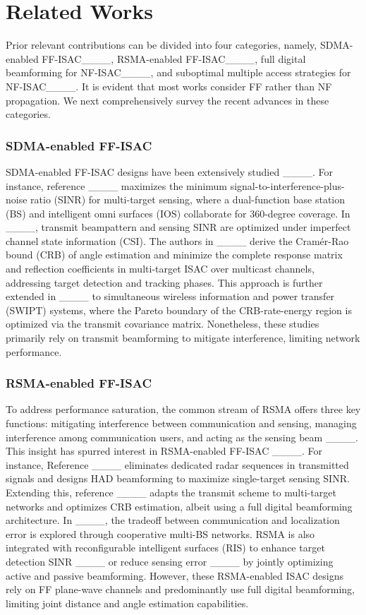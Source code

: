 \section{Related Works}
Prior relevant contributions can be divided into four categories, namely, SDMA-enabled FF-ISAC____, RSMA-enabled FF-ISAC____, full digital beamforming for NF-ISAC____, and suboptimal multiple access strategies for NF-ISAC____. It is evident that most works consider FF rather than NF propagation.  We next comprehensively survey the recent advances in these categories.



\subsubsection{SDMA-enabled FF-ISAC} SDMA-enabled FF-ISAC designs have been extensively studied ____. For instance, reference ____ maximizes the minimum signal-to-interference-plus-noise ratio (SINR) for multi-target sensing, where a dual-function base station (BS) and intelligent omni surfaces (IOS) collaborate for 360-degree coverage. In ____, transmit beampattern and sensing SINR are optimized under imperfect channel state information (CSI). The authors in ____ derive the Cram\'{e}r-Rao bound (CRB) of angle estimation and minimize the complete response matrix and reflection coefficients in multi-target ISAC over multicast channels, addressing target detection and tracking phases. This approach is further extended in ____ to simultaneous wireless information and power transfer (SWIPT) systems, where the Pareto boundary of the CRB-rate-energy region is optimized via the transmit covariance matrix. Nonetheless, these studies primarily rely on transmit beamforming to mitigate interference, limiting network performance.

\subsubsection{RSMA-enabled FF-ISAC} To address performance saturation, the common stream of RSMA offers three key functions: mitigating interference between communication and sensing, managing interference among communication users, and acting as the sensing beam ____. This insight has spurred interest in RSMA-enabled FF-ISAC ____. For instance, Reference ____ eliminates dedicated radar sequences in transmitted signals and designs HAD beamforming to maximize single-target sensing SINR. Extending this, reference ____ adapts the transmit scheme to multi-target networks and optimizes CRB estimation, albeit using a full digital beamforming architecture. In ____, the tradeoff between communication and localization error is explored through cooperative multi-BS networks. RSMA is also integrated with reconfigurable intelligent surfaces (RIS) to enhance target detection SINR ____ or reduce sensing error ____ by jointly optimizing active and passive beamforming. However, these RSMA-enabled ISAC designs rely on FF plane-wave channels and predominantly use full digital beamforming, limiting joint distance and angle estimation capabilities.

